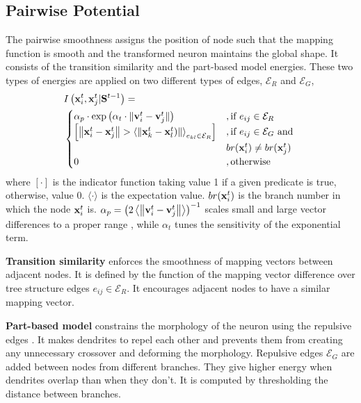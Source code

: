 \documentclass{article}
\begin{document}
\subsection{Pairwise Potential} \label{sec:pairwise_pot}
The pairwise smoothness assigns the position of node such that the mapping function is smooth and the transformed neuron maintains the global shape. It consists of the transition similarity and the part-based model energies. These two types of energies are applied on two different types of edges, $\mathcal{E}_R$ and $\mathcal{E}_G$,
\begin{equation} \label{eq:pairwise}
\begin{aligned}
&I\left({\bf x}_i^t,{\bf x}_j^t | {\bf S}^{t-1}\right) = \\
&\begin{cases}
\alpha_p \cdot \exp \left( \alpha_t \cdot \| {\bf v}_i^t - {\bf v}_j^t \| \right) 
&, \mbox{if } e_{ij} \in \mathcal{E}_R \\
\left[ \left\| {\bf x}_i^t - {\bf x}_j^t \right\| > \left\langle \left\| {\bf x}_k^t - {\bf x}_l^t) \right\| \right\rangle_{e_{kl} \in \mathcal{E}_R} \right]
&, \mbox{if } e_{ij} \in \mathcal{E}_G \mbox{ and } \\
& br({\bf x}_i^t) \neq br({\bf x}_j^t) \\
0 &, \mbox{otherwise}
\end{cases}
\end{aligned}
\end{equation}
where $[\cdot]$ is the indicator function taking value 1 if a given predicate is true, otherwise, value 0. $\langle \cdot \rangle$ is the expectation value. $br({\bf x}_i^t)$ is the branch number in which the node ${\bf x}_i^t$ is. $\alpha_p = \left( 2 \left\langle \left\| {\bf v}_i^t - {\bf v}_j^t \right\| \right\rangle \right)^{-1}$ scales small and large vector differences to a proper range \cite{Boykov2001b}, while $\alpha_t$ tunes the sensitivity of the exponential term.

{\bf Transition similarity} enforces the smoothness of mapping vectors between adjacent nodes. It is defined by the function of the mapping vector difference over tree structure edges $e_{ij} \in \mathcal{E}_R$. It encourages adjacent nodes to have a similar mapping vector.

{\bf Part-based model} constrains the morphology of the neuron using the repulsive edges \cite{Ferrari2009}. It makes dendrites to repel each other and prevents them from creating any unnecessary crossover and deforming the morphology. Repulsive edges $\mathcal{E}_G$ are added between nodes from different branches. They give higher energy when dendrites overlap than when they don't. It is computed by thresholding the distance between branches.
\end{document}
